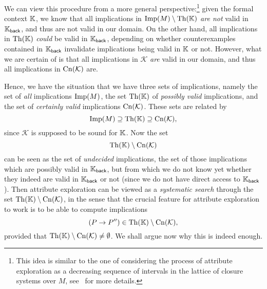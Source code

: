 We can view this procedure from a more general perspective:\footnote{This idea is similar
  to the one of considering the process of attribute exploration as a decreasing sequence
  of intervals in the lattice of closure systems over $M$, see~\cite[pp.\
  143--145]{GORS-book} for more details.} given the formal context ${\mathbb{K}}$, we know that
all implications in $\operatorname{Imp}(M) \setminus \operatorname{Th}({\mathbb{K}})$ \emph{are not} valid in ${\mathbb{K}}_{\mathsf{back}}$, and thus are not valid in our domain.  On the other hand, all
implications in $\operatorname{Th}({\mathbb{K}})$ \emph{could} be valid in ${\mathbb{K}}_{\mathsf{back}}$, depending
on whether counterexamples contained in ${\mathbb{K}}_{\mathsf{back}}$ invalidate implications
being valid in ${\mathbb{K}}$ or not.  However, what we are certain of is that all implications
in $\mathcal{K}$ \emph{are} valid in our domain, and thus all implications in
$\operatorname{Cn}(\mathcal{K})$ are.

Hence, we have the situation that we have three sets of implications, namely the set of
\emph{all} implications $\operatorname{Imp}(M)$, the set $\operatorname{Th}({\mathbb{K}})$ of \emph{possibly valid}
implications, and the set of \emph{certainly valid} implications $\operatorname{Cn}(\mathcal{K})$.
These sets are related by
\begin{equation*}
  \operatorname{Imp}(M) \supseteq \operatorname{Th}({\mathbb{K}}) \supseteq \operatorname{Cn}(\mathcal{K}),
\end{equation*}
since $\mathcal{K}$ is supposed to be sound for ${\mathbb{K}}$.  Now the set
\begin{equation*}
  \operatorname{Th}({\mathbb{K}}) \setminus \operatorname{Cn}(\mathcal{K})
\end{equation*}
can be seen as the set of \emph{undecided} implications, \ie the set of those implications
which are possibly valid in ${\mathbb{K}}_{\mathsf{back}}$, but from which we do not know yet
whether they indeed are valid in ${\mathbb{K}}_{\mathsf{back}}$ or not (since we do not have
direct access to ${\mathbb{K}}_{\mathsf{back}}$).  Then attribute exploration can be viewed as a
\emph{systematic search} through the set $\operatorname{Th}({\mathbb{K}}) \setminus \operatorname{Cn}(\mathcal{K})$, in the
sense that the crucial feature for attribute exploration to work is to be able to compute
implications
\begin{equation}
  \label{eq:33}
  (P \to P'') \in \operatorname{Th}({\mathbb{K}}) \setminus \operatorname{Cn}(\mathcal{K}),
\end{equation}
provided that $\operatorname{Th}({\mathbb{K}}) \setminus \operatorname{Cn}(\mathcal{K}) \neq \emptyset$.  We shall argue now
why this is indeed enough.

